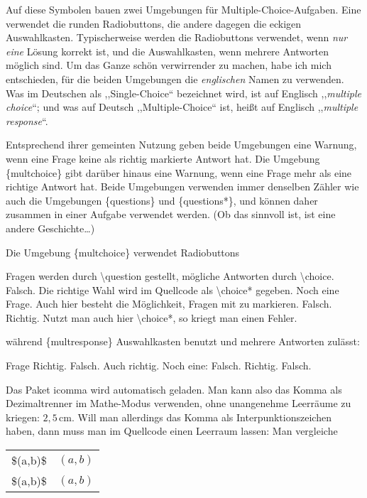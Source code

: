 \documentclass[hyperworksheet]{drcschool}
\newcommand*{\cs}[1]{\textup{\ttfamily\textbackslash#1}}                   %
\newcommand*{\pkg}[1]{\textup{\ttfamily#1}}                                %
\newcommand*{\opt}[1]{\textup{\ttfamily#1}}                                %
\newcommand*{\env}[1]{\textup{\ttfamily\{#1\}}}                            %
\begin{document}
\begin{worksheet}
Auf diese Symbolen bauen zwei Umgebungen für Multiple-Choice-Aufgaben. Eine
verwendet die runden Radiobuttons, die andere dagegen die eckigen Auswahlkasten.
Typischerweise werden die Radiobuttons verwendet, wenn \emph{nur eine} Lösung
korrekt ist, und die Auswahlkasten, wenn mehrere Antworten möglich sind. Um das
Ganze schön verwirrender zu machen, habe ich mich entschieden, für die beiden
Umgebungen die \emph{englischen} Namen zu verwenden. Was im Deutschen als
,,Single-Choice`` bezeichnet wird, ist auf Englisch ,,\emph{multiple choice}``;
und was auf Deutsch ,,Multiple-Choice`` ist, heißt auf Englisch
,,\emph{multiple response}``.

Entsprechend ihrer gemeinten Nutzung geben beide Umgebungen eine Warnung,
wenn eine Frage keine als richtig markierte Antwort hat. Die Umgebung \env{multchoice}
gibt darüber hinaus eine Warnung, wenn eine Frage mehr als eine richtige Antwort
hat. Beide Umgebungen verwenden immer denselben Zähler wie auch die Umgebungen
\env{questions} und \env{questions*}, und können daher zusammen in einer Aufgabe
verwendet werden. (Ob das sinnvoll ist, ist eine andere Geschichte\ldots)

Die Umgebung \env{multchoice} verwendet Radiobuttons
\begin{multchoice}
\question Fragen werden durch \cs{question} gestellt,
   \choice mögliche Antworten durch \cs{choice}.
   \choice Falsch.
   \choice* Die richtige Wahl wird im Quellcode als \cs{choice*} gegeben.
\question* Noch eine Frage. Auch hier besteht die Möglichkeit, Fragen mit \opt{*} zu markieren.
   \choice Falsch.
   \choice* Richtig.
   \choice Nutzt man auch hier \cs{choice*}, so kriegt man einen Fehler.
\end{multchoice}
während \env{multresponse} Auswahlkasten benutzt und mehrere Antworten zulässt:
\begin{multresponse}
\question Frage
   \choice* Richtig.
   \choice Falsch.
   \choice* Auch richtig.
\question Noch eine:
   \choice Falsch.
   \choice* Richtig.
   \choice Falsch.
\end{multresponse}

Das Paket \pkg{icomma} wird automatisch geladen. Man kann also das Komma als Dezimaltrenner
im Mathe-Modus verwenden, ohne unangenehme Leerräume zu kriegen: $2,5\,\mathrm{cm}$.
Will man allerdings das Komma als Interpunktionszeichen haben, dann muss man im Quellcode
einen Leerraum lassen: Man vergleiche
\begin{tabular}[t]{l@{\space\textrightarrow\space}l}
\opt{\$(a,b)\$}  & $(a,b)$ \\
\opt{\$(a,\textvisiblespace b)\$} & $(a, b)$
\end{tabular}

\end{worksheet}
\end{document}
